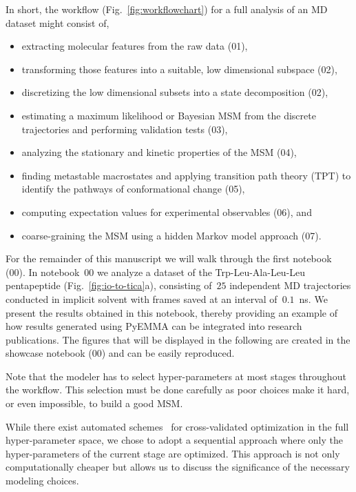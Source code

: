 \documentclass[9pt,tutorial]{livecoms}
\begin{document}
In short, the workflow (Fig.~\ref{fig:workflowchart}) for a full analysis of an MD dataset might consist of,
\begin{itemize}
	\item extracting molecular features from the raw data (01),
	\item transforming those features into a suitable, low dimensional subspace (02),
	\item discretizing the low dimensional subsets into a state decomposition (02),
	\item estimating a maximum likelihood or Bayesian MSM from the discrete trajectories and performing validation tests (03),
	\item analyzing the stationary and kinetic properties of the MSM (04),
	\item finding metastable macrostates and applying transition path theory (TPT) to identify the pathways of conformational change (05),
	\item computing expectation values for experimental observables (06), and
	\item coarse-graining the MSM using a hidden Markov model approach (07).
\end{itemize}

For the remainder of this manuscript we will walk through the first notebook (00).
In notebook~00 we analyze a dataset of the Trp-Leu-Ala-Leu-Leu pentapeptide (Fig.~\ref{fig:io-to-tica}a),
consisting of~$25$ independent MD trajectories conducted in implicit solvent with frames saved at an interval of~$0.1$~ns.
We present the results obtained in this notebook,
thereby providing an example of how results generated using PyEMMA can be integrated into research publications.
The figures that will be displayed in the following are created in the showcase notebook (00) and can be easily reproduced.

Note that the modeler has to select hyper-parameters at most stages throughout the workflow.
This selection must be done carefully as poor choices make it hard, or even impossible, to build a good MSM.

While there exist automated schemes~\cite{husic-optimized} for cross-val\-i\-dat\-ed optimization in the full hyper-parameter space,
we chose to adopt a sequential approach where only the hyper-parameters of the current stage are optimized.
This approach is not only computationally cheaper but allows us to discuss the significance of the necessary modeling choices.
\end{document}
